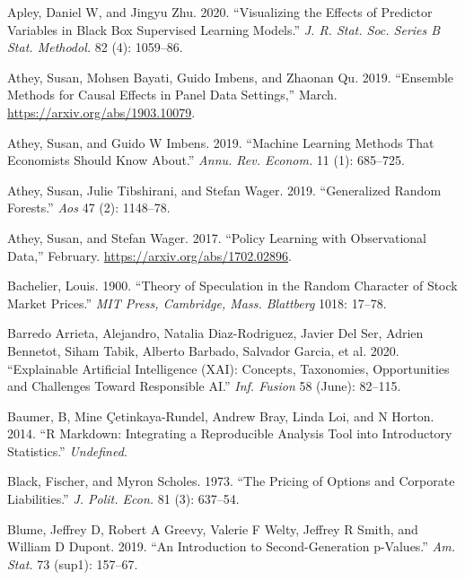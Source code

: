\documentclass{article}
\newlength{\cslhangindent}
\newenvironment{CSLReferences}[2] %
 {%
  \setlength{\parindent}{0pt}
  \ifodd #1 \everypar{\setlength{\hangindent}{\cslhangindent}}\ignorespaces\fi
  \ifnum #2 > 0
  \setlength{\parskip}{#2\baselineskip}
  \fi
 }%
 {}
\begin{document}
\hypertarget{refs}{}
\begin{CSLReferences}{1}{0}
\leavevmode{}%
Apley, Daniel W, and Jingyu Zhu. 2020. {``Visualizing the Effects of
Predictor Variables in Black Box Supervised Learning Models.''} \emph{J.
R. Stat. Soc. Series B Stat. Methodol.} 82 (4): 1059--86.

\leavevmode{}%
Athey, Susan, Mohsen Bayati, Guido Imbens, and Zhaonan Qu. 2019.
{``Ensemble Methods for Causal Effects in Panel Data Settings,''} March.
\url{https://arxiv.org/abs/1903.10079}.

\leavevmode{}%
Athey, Susan, and Guido W Imbens. 2019. {``Machine Learning Methods That
Economists Should Know About.''} \emph{Annu. Rev. Econom.} 11 (1):
685--725.

\leavevmode{}%
Athey, Susan, Julie Tibshirani, and Stefan Wager. 2019. {``Generalized
Random Forests.''} \emph{Aos} 47 (2): 1148--78.

\leavevmode{}%
Athey, Susan, and Stefan Wager. 2017. {``Policy Learning with
Observational Data,''} February. \url{https://arxiv.org/abs/1702.02896}.

\leavevmode{}%
Bachelier, Louis. 1900. {``Theory of Speculation in the Random Character
of Stock Market Prices.''} \emph{MIT Press, Cambridge, Mass. Blattberg}
1018: 17--78.

\leavevmode{}%
Barredo Arrieta, Alejandro, Natalia Diaz-Rodriguez, Javier Del Ser,
Adrien Bennetot, Siham Tabik, Alberto Barbado, Salvador Garcia, et al.
2020. {``Explainable Artificial Intelligence ({XAI)}: Concepts,
Taxonomies, Opportunities and Challenges Toward Responsible {AI}.''}
\emph{Inf. Fusion} 58 (June): 82--115.

\leavevmode{}%
Baumer, B, Mine Çetinkaya-Rundel, Andrew Bray, Linda Loi, and N Horton.
2014. {``{R} Markdown: Integrating a Reproducible Analysis Tool into
Introductory Statistics.''} \emph{Undefined}.

\leavevmode{}%
Black, Fischer, and Myron Scholes. 1973. {``The Pricing of Options and
Corporate Liabilities.''} \emph{J. Polit. Econ.} 81 (3): 637--54.

\leavevmode{}%
Blume, Jeffrey D, Robert A Greevy, Valerie F Welty, Jeffrey R Smith, and
William D Dupont. 2019. {``An Introduction to Second-Generation
p-Values.''} \emph{Am. Stat.} 73 (sup1): 157--67.


\end{CSLReferences}
\end{document}
